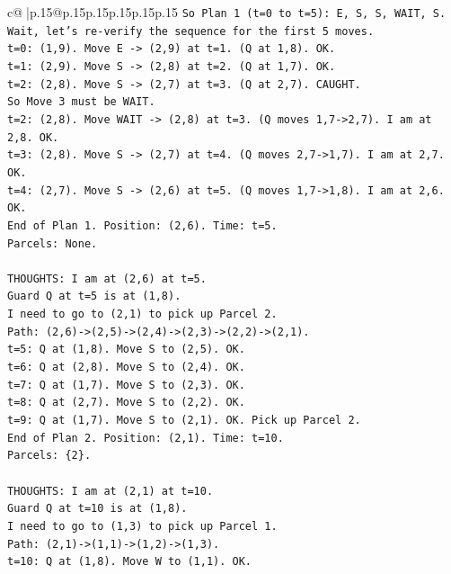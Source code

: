 \documentclass{article}
\begin{document}
{\begin{supertabular}{c@{$\;$}|p{.15\linewidth}@{}p{.15\linewidth}p{.15\linewidth}p{.15\linewidth}p{.15\linewidth}p{.15\linewidth}}
{{{\texttt{So Plan 1 (t=0 to t=5): E, S, S, WAIT, S.} \\
\texttt{Wait, let's re{-}verify the sequence for the first 5 moves.} \\
\texttt{t=0: (1,9). Move E {-}> (2,9) at t=1. (Q at 1,8). OK.} \\
\texttt{t=1: (2,9). Move S {-}> (2,8) at t=2. (Q at 1,7). OK.} \\
\texttt{t=2: (2,8). Move S {-}> (2,7) at t=3. (Q at 2,7). CAUGHT.} \\
\texttt{So Move 3 must be WAIT.} \\
\texttt{t=2: (2,8). Move WAIT {-}> (2,8) at t=3. (Q moves 1,7{-}>2,7). I am at 2,8. OK.} \\
\texttt{t=3: (2,8). Move S {-}> (2,7) at t=4. (Q moves 2,7{-}>1,7). I am at 2,7. OK.} \\
\texttt{t=4: (2,7). Move S {-}> (2,6) at t=5. (Q moves 1,7{-}>1,8). I am at 2,6. OK.} \\
\texttt{End of Plan 1. Position: (2,6). Time: t=5.} \\
\texttt{Parcels: None.} \\
\\ 
\texttt{THOUGHTS: I am at (2,6) at t=5.} \\
\texttt{Guard Q at t=5 is at (1,8).} \\
\texttt{I need to go to (2,1) to pick up Parcel 2.} \\
\texttt{Path: (2,6){-}>(2,5){-}>(2,4){-}>(2,3){-}>(2,2){-}>(2,1).} \\
\texttt{t=5: Q at (1,8). Move S to (2,5). OK.} \\
\texttt{t=6: Q at (2,8). Move S to (2,4). OK.} \\
\texttt{t=7: Q at (1,7). Move S to (2,3). OK.} \\
\texttt{t=8: Q at (2,7). Move S to (2,2). OK.} \\
\texttt{t=9: Q at (1,7). Move S to (2,1). OK. Pick up Parcel 2.} \\
\texttt{End of Plan 2. Position: (2,1). Time: t=10.} \\
\texttt{Parcels: \{2\}.} \\
\\ 
\texttt{THOUGHTS: I am at (2,1) at t=10.} \\
\texttt{Guard Q at t=10 is at (1,8).} \\
\texttt{I need to go to (1,3) to pick up Parcel 1.} \\
\texttt{Path: (2,1){-}>(1,1){-}>(1,2){-}>(1,3).} \\
\texttt{t=10: Q at (1,8). Move W to (1,1). OK.} \\
}}}
\end{supertabular}}
\end{document}
